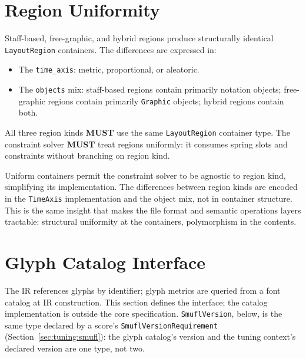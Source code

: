 \documentclass[11pt,letterpaper]{report}
\newcounter{requirement}[chapter]
\newcommand{\MUST}{\textbf{MUST}}
\begin{document}
\section{Region Uniformity}
\label{sec:layoutir:region-uniformity}

Staff-based, free-graphic, and hybrid regions produce structurally
identical \texttt{LayoutRegion} containers. The differences are
expressed in:

\begin{itemize}
  \item The \texttt{time\_axis}: metric, proportional, or aleatoric.
  \item The \texttt{objects} mix: staff-based regions contain
    primarily notation objects; free-graphic regions contain primarily
    \texttt{Graphic} objects; hybrid regions contain both.
\end{itemize}

\begin{requirement}
  \label{req:layoutir:uniform-region-solving}
  All three region kinds \MUST{} use the same \texttt{LayoutRegion}
  container type. The constraint solver \MUST{} treat regions
  uniformly: it consumes spring slots and constraints without
  branching on region kind.
\end{requirement}

\begin{rationale}
  Uniform containers permit the constraint solver to be agnostic to
  region kind, simplifying its implementation. The differences
  between region kinds are encoded in the \texttt{TimeAxis}
  implementation and the object mix, not in container structure.
  This is the same insight that makes the file format and semantic
  operations layers tractable: structural uniformity at the
  containers, polymorphism in the contents.
\end{rationale}

\section{Glyph Catalog Interface}
\label{sec:layoutir:catalog}

The IR references glyphs by identifier; glyph metrics are queried
from a font catalog at IR construction. This section defines the
interface; the catalog implementation is outside the core
specification. \texttt{SmuflVersion}, below, is the same type declared
by a score's \texttt{SmuflVersionRequirement}
(Section~\ref{sec:tuning:smufl}): the glyph catalog's version and the
tuning context's declared version are one type, not two.
\end{document}
